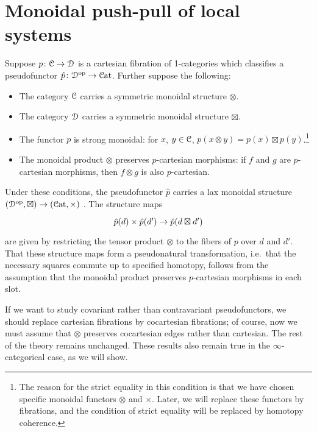 \documentclass[main.tex]{subfiles}
\begin{document}
\section{Monoidal push-pull of local systems}
\label{sec:the_monoidal_construction}

Suppose $p\colon \mathcal{C} \to \mathcal{D}$ is a cartesian fibration of 1-categories which classifies a pseudofunctor $\hat{p}\colon \mathcal{D}^{\mathrm{op}} \to \mathcal{C}\mathrm{at}$. Further suppose the following:
\begin{itemize}
  \item The category $\mathcal{C}$ carries a symmetric monoidal structure $\otimes$.

  \item The category $\mathcal{D}$ carries a symmetric monoidal structure $\boxtimes$.

  \item The functor $p$ is strong monoidal: for $x$, $y \in \mathcal{C}$, $p(x \otimes y) = p(x) \boxtimes p(y)$.\footnote{The reason for the strict equality in this condition is that we have chosen specific monoidal functors $\otimes$ and $\times$. Later, we will replace these functors by fibrations, and the condition of strict equality will be replaced by homotopy coherence.}

  \item The monoidal product $\otimes$ preserves $p$-cartesian morphisms: if $f$ and $g$ are $p$-cartesian morphisms, then $f \otimes g$ is also $p$-cartesian.
\end{itemize}
Under these conditions, the pseudofunctor $\hat{p}$ carries a lax monoidal structure $(\mathcal{D}^{\mathrm{op}}, \boxtimes) \to (\mathcal{C}\mathrm{at}, \times)$ \cite{moeller2018monoidal}. The structure maps
\begin{equation*}
  \begin{tikzcd}
    \hat{p}(d) \times \hat{p}(d') \to \hat{p}(d \boxtimes d')
  \end{tikzcd}
\end{equation*}
are given by restricting the tensor product $\otimes$ to the fibers of $p$ over $d$ and $d'$. That these structure maps form a pseudonatural transformation, i.e.\ that the necessary squares commute up to specified homotopy, follows from the assumption that the monoidal product preserves $p$-cartesian morphisms in each slot.

If we want to study covariant rather than contravariant pseudofunctors, we should replace cartesian fibrations by cocartesian fibrations; of course, now we must assume that $\otimes$ preserves cocartesian edges rather than cartesian. The rest of the theory remains unchanged. These results also remain true in the $\infty$-categorical case, as we will show.
\end{document}
